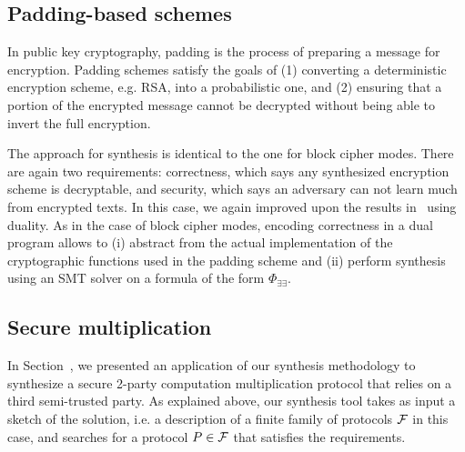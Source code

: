\documentclass[preprint]{sig-alternate-05-2015}
\begin{document}
\subsection{Padding-based schemes}

In public key cryptography, padding is the process of preparing a
message for encryption.  %
Padding schemes %
satisfy the goals of (1) converting a deterministic
encryption scheme, e.g. RSA, into a probabilistic one, and (2)
ensuring that a portion of the encrypted message cannot be decrypted
without being able to invert the full encryption.


The approach for synthesis is identical to the one for block cipher modes.
There are again two requirements: 
correctness, which says any synthesized encryption scheme is decryptable,
and security, which says an adversary can not learn much from encrypted texts.
In this case, we again improved upon the results in~\cite{TGD15:CADE}
using duality. As in the case of
block cipher modes, encoding correctness in a dual program
allows to (i) abstract from the actual implementation of
the cryptographic functions used in the padding scheme and
(ii) perform synthesis using an SMT solver on a formula of the form $\Phi_{\exists\exists}$.


\subsection{Secure multiplication}
In Section~\label{sec:ex}, we presented an application
of our synthesis methodology to synthesize a secure 2-party
computation multiplication protocol that relies on a third semi-trusted
party. As explained above, our synthesis tool takes as input a sketch of the 
solution, i.e. a description of a finite family of protocols 
${\cal F}$ in this case, and searches for a protocol $P\in{\cal F}$
that satisfies the requirements. 
\end{document}
